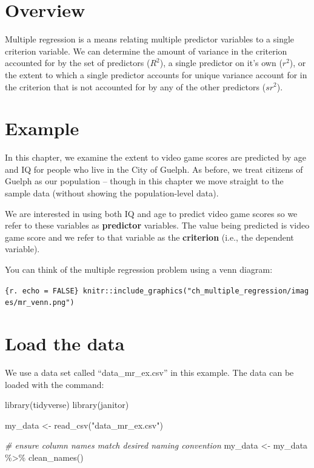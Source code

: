 \documentclass[
]{krantz}
\makeatletter
\newenvironment{Shaded}{\begin{snugshade}}{\end{snugshade}}
\newcommand{\CommentTok}[1]{\textcolor[rgb]{0.37,0.37,0.37}{\textit{#1}}}
\newcommand{\FunctionTok}[1]{\textcolor[rgb]{0,0,0}{#1}}
\newcommand{\NormalTok}[1]{#1}
\newcommand{\OtherTok}[1]{\textcolor[rgb]{0.37,0.37,0.37}{#1}}
\newcommand{\SpecialCharTok}[1]{\textcolor[rgb]{0,0,0}{#1}}
\newcommand{\StringTok}[1]{\textcolor[rgb]{0.5,0.5,0.5}{#1}}
\newenvironment{kframe}{%
\medskip{}
\setlength{\fboxsep}{.8em}
 \def\at@end@of@kframe{}%
 \ifinner\ifhmode%
  \def\at@end@of@kframe{\end{minipage}}%
  \begin{minipage}{\columnwidth}%
 \fi\fi%
 \def\FrameCommand##1{\hskip\@totalleftmargin \hskip-\fboxsep
 \colorbox{shadecolor}{##1}\hskip-\fboxsep
     \hskip-\linewidth \hskip-\@totalleftmargin \hskip\columnwidth}%
 \MakeFramed {\advance\hsize-\width
   \@totalleftmargin\z@ \linewidth\hsize
   \@setminipage}}%
 {\par\unskip\endMakeFramed%
 \at@end@of@kframe}
\renewenvironment{Shaded}{\begin{kframe}}{\end{kframe}}
\makeatother
\begin{document}
\hypertarget{overview-6}{%
\section{Overview}\label{overview-6}}

Multiple regression is a means relating multiple predictor variables to a single criterion variable. We can determine the amount of variance in the criterion accounted for by the set of predictors (\(R^2\)), a single predictor on it's own (\(r^2\)), or the extent to which a single predictor accounts for unique variance account for in the criterion that is not accounted for by any of the other predictors (\(sr^2\)).

\hypertarget{example}{%
\section{Example}\label{example}}

In this chapter, we examine the extent to video game scores are predicted by age and IQ for people who live in the City of Guelph. As before, we treat citizens of Guelph as our population -- though in this chapter we move straight to the sample data (without showing the population-level data).

We are interested in using both IQ and age to predict video game scores so we refer to these variables as \textbf{predictor} variables. The value being predicted is video game score and we refer to that variable as the \textbf{criterion} (i.e., the dependent variable).

You can think of the multiple regression problem using a venn diagram:

\texttt{\{r.\ echo\ =\ FALSE\}\ knitr::include\_graphics("ch\_multiple\_regression/images/mr\_venn.png")}

\hypertarget{load-the-data}{%
\section{Load the data}\label{load-the-data}}

We use a data set called ``data\_mr\_ex.csv'' in this example. The data can be loaded with the command:

\begin{Shaded}
\begin{Highlighting}[]
\FunctionTok{library}\NormalTok{(tidyverse)}
\FunctionTok{library}\NormalTok{(janitor)}

\NormalTok{my\_data }\OtherTok{\textless{}{-}} \FunctionTok{read\_csv}\NormalTok{(}\StringTok{"data\_mr\_ex.csv"}\NormalTok{)}

\CommentTok{\# ensure column names match desired naming convention}
\NormalTok{my\_data }\OtherTok{\textless{}{-}}\NormalTok{ my\_data }\SpecialCharTok{\%\textgreater{}\%}
  \FunctionTok{clean\_names}\NormalTok{()}
\end{Highlighting}
\end{Shaded}
\end{document}
